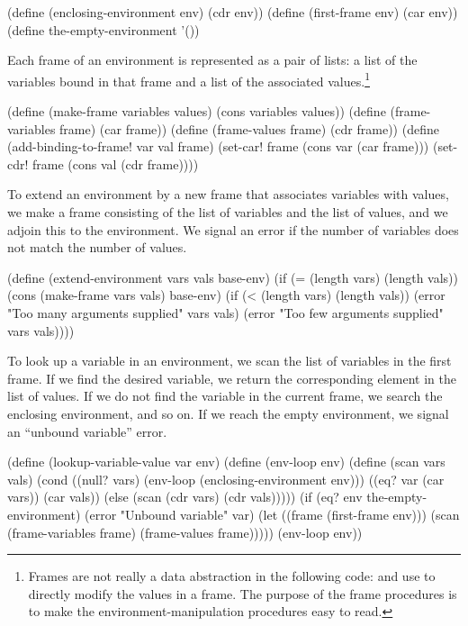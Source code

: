 \begin{codeBlock}
(define (enclosing-environment env) (cdr env))
(define (first-frame env) (car env))
(define the-empty-environment '())
\end{codeBlock}

\noindent
Each frame of an environment is represented as a pair of lists: a list of the
variables bound in that frame and a list of the associated
values.\footnote{Frames are not really a data abstraction in the following
code:  and  use
  to directly modify the values in a frame.  The purpose of the
frame procedures is to make the environment-manipulation procedures easy to
read.}

\begin{codeBlock}
(define (make-frame variables values)
  (cons variables values))
(define (frame-variables frame) (car frame))
(define (frame-values frame) (cdr frame))
(define (add-binding-to-frame! var val frame)
  (set-car! frame (cons var (car frame)))
  (set-cdr! frame (cons val (cdr frame))))
\end{codeBlock}

\noindent
To extend an environment by a new frame that associates variables with values,
we make a frame consisting of the list of variables and the list of values, and
we adjoin this to the environment.  We signal an error if the number of
variables does not match the number of values.

\begin{codeBlock}
(define (extend-environment vars vals base-env)
  (if (= (length vars) (length vals))
      (cons (make-frame vars vals) base-env)
      (if (< (length vars) (length vals))
          (error "Too many arguments supplied"
                 vars
                 vals)
          (error "Too few arguments supplied"
                 vars
                 vals))))
\end{codeBlock}

\noindent
To look up a variable in an environment, we scan the list of variables in the
first frame.  If we find the desired variable, we return the corresponding
element in the list of values.  If we do not find the variable in the current
frame, we search the enclosing environment, and so on.  If we reach the empty
environment, we signal an ``unbound variable'' error.

\begin{codeBlock}
(define (lookup-variable-value var env)
  (define (env-loop env)
    (define (scan vars vals)
      (cond ((null? vars)
             (env-loop (enclosing-environment env)))
            ((eq? var (car vars)) (car vals))
            (else (scan (cdr vars) (cdr vals)))))
    (if (eq? env the-empty-environment)
        (error "Unbound variable" var)
        (let ((frame (first-frame env)))
          (scan (frame-variables frame)
                (frame-values frame)))))
  (env-loop env))
\end{codeBlock}

